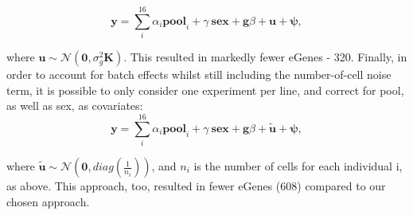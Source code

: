 \begin{equation}\label{eq:neuroseq_batch_kinship}
    \mathbf{y} = \sum_i^{16}\alpha_i \mathbf{pool}_i + 
    \gamma \ \mathbf{sex} + 
    \mathbf{g}\beta + \mathbf{u} + \boldsymbol{\psi}, 
\end{equation}

where $ \mathbf{u} \sim \mathcal{N}(\mathbf{0},\sigma_g^2\mathbf{K})$.
This resulted in markedly fewer eGenes - 320.
Finally, in order to account for batch effects whilst still including the number-of-cell noise term, it is possible to only consider one experiment per line, and correct for pool, as well as sex, as covariates:
\begin{equation}\label{eq:neuroseq_batch_ncell}
    \mathbf{y} = \sum_i^{16}\alpha_i \mathbf{pool}_i + \gamma \ \mathbf{sex} + \mathbf{g}\beta + \tilde{\mathbf{u}} + \boldsymbol{\psi}, 
\end{equation}

where $\tilde{\mathbf{u}} \sim \mathcal{N}(\mathbf{0}, diag(\frac{1}{n_i}))$, and $n_i$ is the number of cells for each individual i, as above.
This approach, too, resulted in fewer eGenes (608) compared to our chosen approach.

